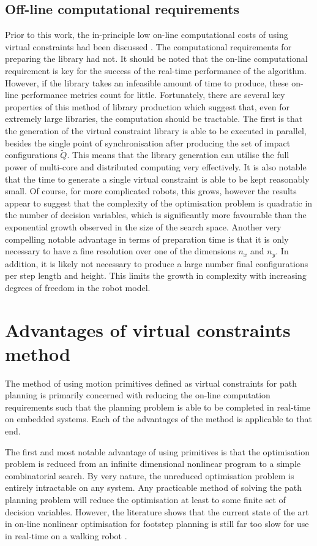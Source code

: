 \subsection{Off-line computational requirements}
Prior to this work, the in-principle low on-line computational costs of using virtual constraints had been discussed \cite{manchester13planning}. The computational requirements for preparing the library had not. It should be noted that the on-line computational requirement is key for the success of the real-time performance of the algorithm. However, if the library takes an infeasible amount of time to produce, these on-line performance metrics count for little. Fortunately, there are several key properties of this method of library production which suggest that, even for extremely large libraries, the computation should be tractable. The first is that the generation of the virtual constraint library is able to be executed in parallel, besides the single point of synchronisation after producing the set of impact configurations $\tilde{Q}$. This means that the library generation can utilise the full power of multi-core and distributed computing very effectively. It is also notable that the time to generate a single virtual constraint is able to be kept reasonably small. Of course, for more complicated robots, this grows, however the results appear to suggest that the complexity of the optimisation problem is quadratic in the number of decision variables, which is significantly more favourable than the exponential growth observed in the size of the search space. Another very compelling notable advantage in terms of preparation time is that it is only necessary to have a fine resolution over one of the dimensions $n_x$ and $n_y$. In addition, it is likely not necessary to produce a large number final configurations per step length and height. This limits the growth in complexity with increasing degrees of freedom in the robot model.

\section{Advantages of virtual constraints method}
The method of using motion primitives defined as virtual constraints for path planning is primarily concerned with reducing the on-line computation requirements such that the planning problem is able to be completed in real-time on embedded systems. Each of the advantages of the method is applicable to that end.

The first and most notable advantage of using primitives is that the optimisation problem is reduced from an infinite dimensional nonlinear program to a simple combinatorial search. By very nature, the unreduced optimisation problem is entirely intractable on any system. Any practicable method of solving the path planning problem will reduce the optimisation at least to some finite set of decision variables. However, the literature shows that the current state of the art in on-line nonlinear optimisation for footstep planning is still far too slow for use in real-time on a walking robot \cite{shkolnik2011bounding}.

